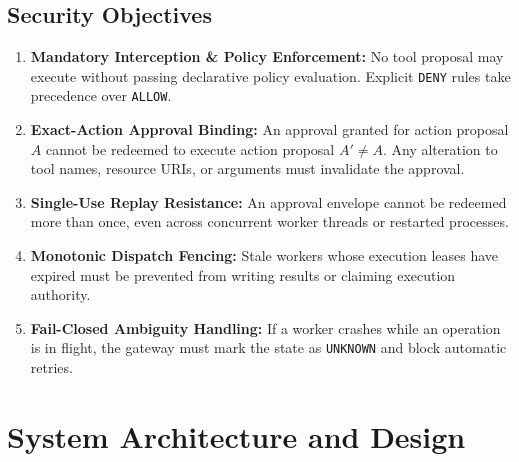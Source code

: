\documentclass[sigconf,anonymous,review]{acmart}
\begin{document}
\subsection{Security Objectives}
\begin{enumerate}
    \item \textbf{Mandatory Interception \& Policy Enforcement:} No tool proposal may execute without passing declarative policy evaluation. Explicit \texttt{DENY} rules take precedence over \texttt{ALLOW}.
    \item \textbf{Exact-Action Approval Binding:} An approval granted for action proposal $A$ cannot be redeemed to execute action proposal $A' \neq A$. Any alteration to tool names, resource URIs, or arguments must invalidate the approval.
    \item \textbf{Single-Use Replay Resistance:} An approval envelope cannot be redeemed more than once, even across concurrent worker threads or restarted processes.
    \item \textbf{Monotonic Dispatch Fencing:} Stale workers whose execution leases have expired must be prevented from writing results or claiming execution authority.
    \item \textbf{Fail-Closed Ambiguity Handling:} If a worker crashes while an operation is in flight, the gateway must mark the state as \texttt{UNKNOWN} and block automatic retries.
\end{enumerate}

\section{System Architecture and Design}
\end{document}
